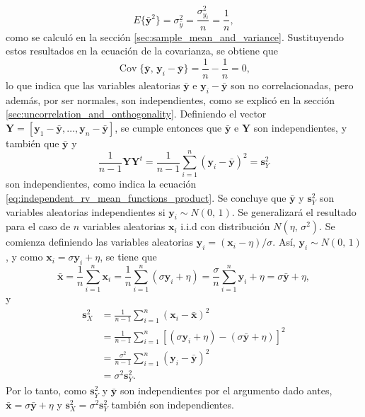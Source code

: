 \documentclass[a4paper]{report}
\newcommand{\Y}{\mathbf{Y}}
\newcommand{\x}{\mathbf{x}}
\newcommand{\y}{\mathbf{y}}
\begin{document}
\[
 E\{{\bar{\y}}^2\}=\sigma_{\bar{y}}^2=\frac{\sigma_{y_i}^2}{n}=\frac{1}{n},
\]
como se calculó en la sección \ref{sec:sample_mean_and_variance}. Sustituyendo estos resultados en la ecuación de la covarianza, se obtiene que
\[
 \operatorname{Cov}\{\bar{\y},\,\y_i-\bar{\y}\}=\frac{1}{n}-\frac{1}{n}=0,
\]
lo que indica que las variables aleatorias \(\bar{\y}\) e \(\y_i-\bar{\y}\) son no correlacionadas, pero además, por ser normales, son independientes, como se explicó en la sección \ref{sec:uncorrelation_and_onthogonality}. Definiendo el vector \(\Y=[\y_1-\bar{\y},\dots,\y_n-\bar{\y}]\), se cumple entonces que \(\bar{\y}\) e \(\Y\) son independientes, y también que \(\bar{\y}\) y
\[
 \frac{1}{n-1}\Y\Y^t=\frac{1}{n-1}\sum_{i=1}^{n}(\y_i-\bar{\y})^2=\mathbf{s}^2_Y
\]
son independientes, como indica la ecuación \ref{eq:independent_rv_mean_functions_product}. Se concluye que \(\bar{\y}\) y \(\mathbf{s}_Y^2\) son variables aleatorias independientes si \(\y_i\sim N(0,\,1)\). Se generalizará el resultado para el caso de \(n\) variables aleatorias \(\x_i\) i.i.d con distribución \(N(\eta,\,\sigma^2)\). Se comienza definiendo las variables aleatorias \(\y_i=(\x_i-\eta)/\sigma\). Así, \(\y_i\sim N(0,\,1)\), y como \(\x_i=\sigma \y_i+\eta\), se tiene que
\[
 \bar{\x}=\frac{1}{n}\sum_{i=1}^{n}\x_i=\frac{1}{n}\sum_{i=1}^{n}(\sigma \y_i+\eta)=\frac{\sigma}{n}\sum_{i=1}^{n}\y_i+\eta=\sigma\bar{\y}+\eta,
\]
y
\begin{align*}
 \mathbf{s}^2_X&=\frac{1}{n-1}\sum_{i=1}^{n}(\x_i-\bar{\x})^2\\
   &=\frac{1}{n-1}\sum_{i=1}^{n}\left[(\sigma \y_i+\eta)-(\sigma \bar{\y}+\eta)\right]^2\\
   &=\frac{\sigma^2}{n-1}\sum_{i=1}^{n}\left(\y_i-\bar{\y}\right)^2\\
   &=\sigma^2\mathbf{s}_Y^2.
\end{align*}
Por lo tanto, como \(\mathbf{s}_Y^2\) y \(\bar{\y}\) son independientes por el argumento dado antes, \(\bar{\x}=\sigma\bar{\y}+\eta\) y \(\mathbf{s}^2_X=\sigma^2\mathbf{s}_Y^2\) también son independientes.
\end{document}
